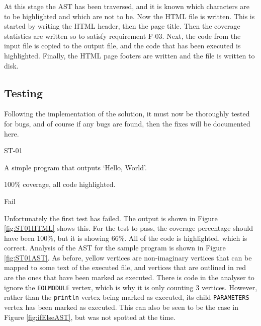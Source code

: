 At this stage the AST has been traversed, and it is known which characters are to be highlighted and which are not to be. Now the HTML file is written. This is started by writing the HTML header, then the page title. Then the coverage statistics are written so to satisfy requirement F-03. Next, the code from the input file is copied to the output file, and the code that has been executed is highlighted. Finally, the HTML page footers are written and the file is written to disk.

\subsection{Testing}
Following the implementation of the solution, it must now be thoroughly tested for bugs, and of course if any bugs are found, then the fixes will be documented here.

\begin{samepage}
\begin{description}[style=sameline,leftmargin=3.5cm,nolistsep]
\item[\hspace*{0.3cm}Label] ST-01
\item[\hspace*{0.3cm}Description] A simple program that outputs `Hello, World'.
\item[\hspace*{0.3cm}Expected Output] 100\% coverage, all code highlighted.
\item[\hspace*{0.3cm}Result] Fail
\end{description}
\end{samepage}

Unfortunately the first test has failed. The output is shown in Figure \ref{fig:ST01HTML} shows this. For the test to pass, the coverage percentage should have been 100\%, but it is showing 66\%. All of the code is highlighted, which is correct. Analysis of the AST for the sample program is shown in Figure \ref{fig:ST01AST}. As before, yellow vertices are non-imaginary vertices that can be mapped to some text of the executed file, and vertices that are outlined in red are the ones that have been marked as executed. There is code in the analyser to ignore the \verb|EOLMODULE| vertex, which is why it is only counting 3 vertices. However, rather than the \verb|println| vertex being marked as executed, its child \verb|PARAMETERS| vertex has been marked as executed. This can also be seen to be the case in Figure \ref{fig:ifElseAST}, but was not spotted at the time. 

